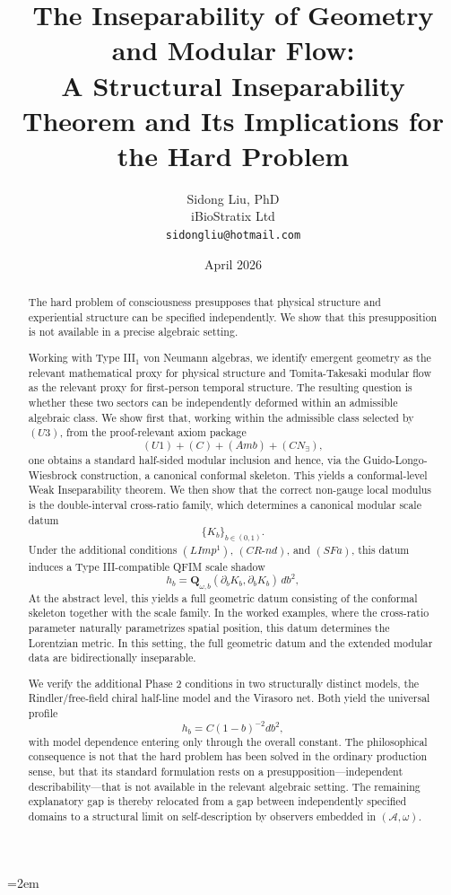 \documentclass[12pt]{article}
\title{%
  \textbf{The Inseparability of Geometry and Modular Flow:}\\
  \textbf{A Structural Inseparability Theorem and Its Implications for the Hard Problem}%
}
\author{
  Sidong Liu, PhD \\
  \small iBioStratix Ltd \\
  \small \texttt{sidongliu@hotmail.com}
}
\date{April 2026}
\theoremstyle{definition}
\theoremstyle{remark}
\begin{document}
\emergencystretch=2em
\raggedbottom
{}

\maketitle

\begin{abstract}
%
The hard problem of consciousness presupposes that physical structure
and experiential structure can be specified independently. We show that
this presupposition is not available in a precise algebraic setting.

Working with Type III\(_1\) von Neumann algebras, we identify emergent
geometry as the relevant mathematical proxy for physical structure and
Tomita-Takesaki modular flow as the relevant proxy for first-person
temporal structure. The resulting question is whether these two sectors
can be independently deformed within an admissible algebraic class. We
show first that, working within the admissible class selected by
\((U3)\), from the proof-relevant axiom package \[
(U1)+(C)+(Amb)+(CN_\exists),
\] one obtains a standard half-sided modular inclusion and hence, via
the Guido-Longo-Wiesbrock construction, a canonical conformal skeleton.
This yields a conformal-level Weak Inseparability theorem. We then show
that the correct non-gauge local modulus is the double-interval
cross-ratio family, which determines a canonical modular scale datum \[
\{K_b\}_{b\in(0,1)}.
\] Under the additional conditions \((LImp^1)\), \((CR\text{-}nd)\), and
\((SFa)\), this datum induces a Type III-compatible QFIM scale shadow \[
h_b=\mathbf{Q}_{\omega,b}(\partial_b K_b,\partial_b K_b)\,db^2,
\] At the abstract level, this yields a full geometric datum consisting
of the conformal skeleton together with the scale family. In the worked
examples, where the cross-ratio parameter naturally parametrizes spatial
position, this datum determines the Lorentzian metric. In this setting,
the full geometric datum and the extended modular data are
bidirectionally inseparable.

We verify the additional Phase 2 conditions in two structurally distinct
models, the Rindler/free-field chiral half-line model and the Virasoro
net. Both yield the universal profile \[
h_b=C(1-b)^{-2}db^2,
\] with model dependence entering only through the overall constant. The
philosophical consequence is not that the hard problem has been solved
in the ordinary production sense, but that its standard formulation
rests on a presupposition---independent describability---that is not
available in the relevant algebraic setting. The remaining explanatory gap is
thereby relocated from a gap between independently specified domains to
a structural limit on self-description by observers embedded in
\((\mathcal{A},\omega)\).
 \end{abstract}
\end{document}
